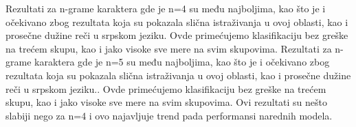 \documentclass[12pt,oneside]{memoir}
\begin{document}
\newline
\newline
\noindent
Rezultati za n-grame karaktera gde je n=4 su među najboljima, kao što je i očekivano zbog rezultata koja su pokazala slična istraživanja u ovoj oblasti, kao i prosečne dužine reči u srpskom jeziku. Ovde primećujemo klasifikaciju bez greške na trećem skupu, kao i jako visoke sve mere na svim skupovima. 
\newline
\newline
\noindent{}
\newline
\newline
\noindent
Rezultati za n-grame karaktera gde je n=5 su među najboljima, kao što je i očekivano zbog rezultata koja su pokazala slična istraživanja u ovoj oblasti, kao i prosečne dužine reči u srpskom jeziku.. Ovde primećujemo klasifikaciju bez greške na trećem skupu, kao i jako visoke sve mere na svim skupovima. Ovi rezultati su nešto slabiji nego za n=4 i ovo najavljuje trend pada performansi narednih modela.
\newline
\newline
\end{document}
